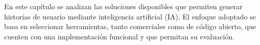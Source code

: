 En este capítulo se analizan las soluciones disponibles que permiten generar historias de usuario mediante inteligencia artificial (IA). El enfoque adoptado se basa en seleccionar herramientas, tanto comerciales como de código abierto, que cuenten con una implementación funcional y que permitan su evaluación.





